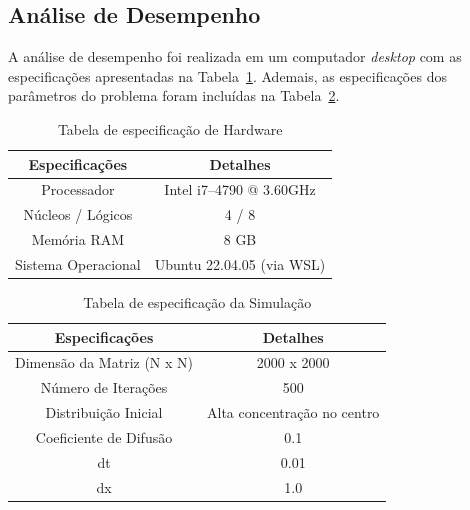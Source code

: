 \documentclass[12pt]{article}
\begin{document}
\subsection{Análise de Desempenho}

A análise de desempenho foi realizada em um computador \textit{desktop} com as
especificações apresentadas na Tabela~\ref{tab:especificacaoHardware}. Ademais,
as especificações dos parâmetros do
problema foram incluídas na Tabela~\ref{tab:especificacaoSimulacao}.

\begin{table}[ht]
  \centering
  \caption{Tabela de especificação de Hardware}
  \vspace{0.3cm}
  \begin{tabular}{||c c||}
    \hline
    Especificações      & Detalhes                  \\ [0.5ex]
    \hline\hline
    Processador         & Intel i7--4790 @ 3.60GHz  \\
    \hline
    Núcleos / Lógicos   & 4 / 8                     \\
    \hline
    Memória RAM         & 8 GB                      \\
    \hline
    Sistema Operacional & Ubuntu 22.04.05 (via WSL) \\
    \hline
  \end{tabular}
  \label{tab:especificacaoHardware}
\end{table}

\begin{table}[ht]
  \centering
  \caption{Tabela de especificação da Simulação}
  \vspace{0.3cm}
  \begin{tabular}{||c c||}
    \hline
    Especificações             & Detalhes                    \\ [0.5ex]
    \hline\hline
    Dimensão da Matriz (N x N) & 2000 x 2000                 \\
    \hline
    Número de Iterações        & 500                         \\
    \hline
    Distribuição Inicial       & Alta concentração no centro \\
    \hline
    Coeficiente de Difusão     & 0.1                         \\
    \hline
    dt                         & 0.01                        \\
    \hline
    dx                         & 1.0                         \\
    \hline
  \end{tabular}
  \label{tab:especificacaoSimulacao}
\end{table}
\end{document}
